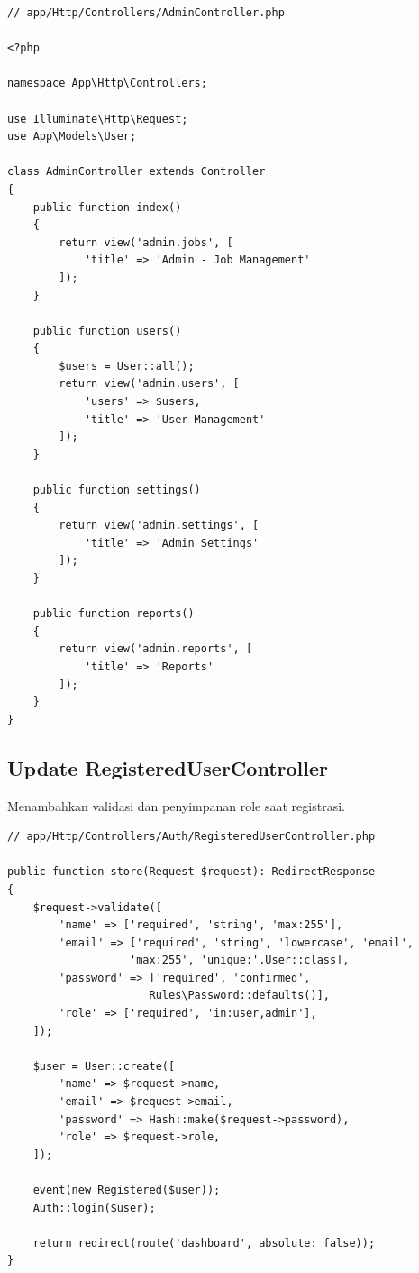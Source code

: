 \documentclass[a4paper,oneside,11pt]{book}
\begin{document}
\begin{lstlisting}[style=phpstyle]
// app/Http/Controllers/AdminController.php

<?php

namespace App\Http\Controllers;

use Illuminate\Http\Request;
use App\Models\User;

class AdminController extends Controller
{
    public function index()
    {
        return view('admin.jobs', [
            'title' => 'Admin - Job Management'
        ]);
    }

    public function users()
    {
        $users = User::all();
        return view('admin.users', [
            'users' => $users,
            'title' => 'User Management'
        ]);
    }

    public function settings()
    {
        return view('admin.settings', [
            'title' => 'Admin Settings'
        ]);
    }

    public function reports()
    {
        return view('admin.reports', [
            'title' => 'Reports'
        ]);
    }
}
\end{lstlisting}

\subsection{Update RegisteredUserController}
Menambahkan validasi dan penyimpanan role saat registrasi.

\begin{lstlisting}[style=phpstyle]
// app/Http/Controllers/Auth/RegisteredUserController.php

public function store(Request $request): RedirectResponse
{
    $request->validate([
        'name' => ['required', 'string', 'max:255'],
        'email' => ['required', 'string', 'lowercase', 'email', 
                   'max:255', 'unique:'.User::class],
        'password' => ['required', 'confirmed', 
                      Rules\Password::defaults()],
        'role' => ['required', 'in:user,admin'],
    ]);

    $user = User::create([
        'name' => $request->name,
        'email' => $request->email,
        'password' => Hash::make($request->password),
        'role' => $request->role,
    ]);

    event(new Registered($user));
    Auth::login($user);

    return redirect(route('dashboard', absolute: false));
}
\end{lstlisting}
\end{document}
